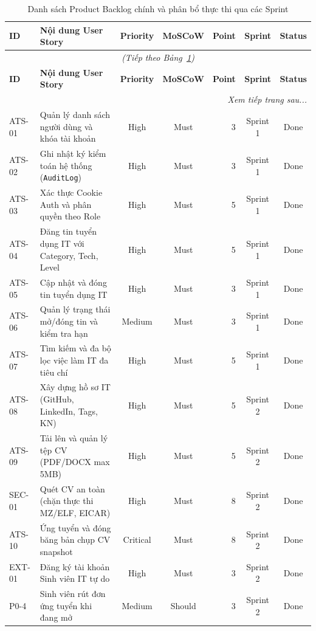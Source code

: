 \begin{longtable}{p{1.2cm} p{5.5cm} c c r c c}
\caption{Danh sách Product Backlog chính và phân bổ thực thi qua các Sprint} \label{tab:product-backlog} \\
\toprule
\textbf{ID} & \textbf{Nội dung User Story} & \textbf{Priority} & \textbf{MoSCoW} & \textbf{Point} & \textbf{Sprint} & \textbf{Status} \\
\midrule
\endfirsthead
\multicolumn{7}{c}{\textit{(Tiếp theo Bảng~\ref{tab:product-backlog})}} \\
\toprule
\textbf{ID} & \textbf{Nội dung User Story} & \textbf{Priority} & \textbf{MoSCoW} & \textbf{Point} & \textbf{Sprint} & \textbf{Status} \\
\midrule
\endhead
\midrule
\multicolumn{7}{r}{\textit{Xem tiếp trang sau...}} \\
\bottomrule
\endfoot
\bottomrule
\endlastfoot
ATS-01 & Quản lý danh sách người dùng và khóa tài khoản & High & Must & 3 & Sprint 1 & Done \\
ATS-02 & Ghi nhật ký kiểm toán hệ thống (\texttt{AuditLog}) & High & Must & 3 & Sprint 1 & Done \\
ATS-03 & Xác thực Cookie Auth và phân quyền theo Role & High & Must & 5 & Sprint 1 & Done \\
ATS-04 & Đăng tin tuyển dụng IT với Category, Tech, Level & High & Must & 5 & Sprint 1 & Done \\
ATS-05 & Cập nhật và đóng tin tuyển dụng IT & High & Must & 3 & Sprint 1 & Done \\
ATS-06 & Quản lý trạng thái mở/đóng tin và kiểm tra hạn & Medium & Must & 3 & Sprint 1 & Done \\
ATS-07 & Tìm kiếm và đa bộ lọc việc làm IT đa tiêu chí & High & Must & 5 & Sprint 1 & Done \\
\midrule
ATS-08 & Xây dựng hồ sơ IT (GitHub, LinkedIn, Tags, KN) & High & Must & 5 & Sprint 2 & Done \\
ATS-09 & Tải lên và quản lý tệp CV (PDF/DOCX max 5MB) & High & Must & 5 & Sprint 2 & Done \\
SEC-01 & Quét CV an toàn (chặn thực thi MZ/ELF, EICAR) & High & Must & 8 & Sprint 2 & Done \\
ATS-10 & Ứng tuyển và đóng băng bản chụp CV snapshot & Critical & Must & 8 & Sprint 2 & Done \\
EXT-01 & Đăng ký tài khoản Sinh viên IT tự do & High & Must & 3 & Sprint 2 & Done \\
P0-4 & Sinh viên rút đơn ứng tuyển khi đang mở & Medium & Should & 3 & Sprint 2 & Done \\

\end{longtable}
